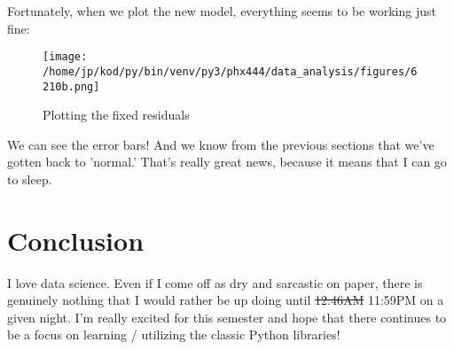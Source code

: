\documentclass{article}
\begin{document}
Fortunately, when we plot the new model, everything seems to be working just
fine:
\begin{figure}[H]
        \begin{center}
        \texttt{[image: /home/jp/kod/py/bin/venv/py3/phx444/data\_analysis/figures/6210b.png]}
        \caption{Plotting the fixed residuals}
        \label{fig:fig_22}
        \end{center}
\end{figure}
We can see the error bars! And we know from the previous sections that we've
gotten back to 'normal.' That's really great news, because it means that I can
go to sleep.

\section{Conclusion}
I love data science. Even if I come off as dry and sarcastic on paper,
there is genuinely nothing that I would rather be up doing until \st{12:46AM}
11:59PM on a given night. I'm really excited for this semester and hope that
there continues to be a focus on learning / utilizing the classic Python
libraries!
\end{document}
